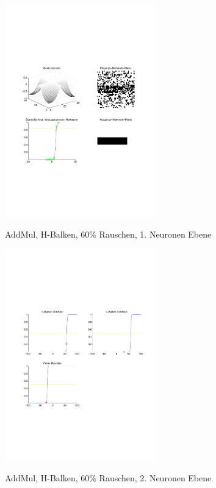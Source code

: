 \begin{figure}[hbt]
	\begin{minipage}[c]{\textwidth}
		\centering
       	\includegraphics[trim=71 213 43 212, clip, width=0.58\textwidth]{./Bilder/Auswertung/Endergebnis/TypeAddMul_Rauschen60_H_Line_Layer1}
		\caption{AddMul, H-Balken, 60\% Rauschen, 1. Neuronen Ebene}
		\label{AddMul_H_60_1}
		\vfill
		\includegraphics[trim=71 213 43 212, clip, width=0.58\textwidth]{./Bilder/Auswertung/Endergebnis/TypeAddMul_Rauschen60_H_Line_Layer2}
		\caption{AddMul, H-Balken, 60\% Rauschen, 2. Neuronen Ebene}
		\label{AddMul_H_60_2}
	\end{minipage}
\end{figure}

